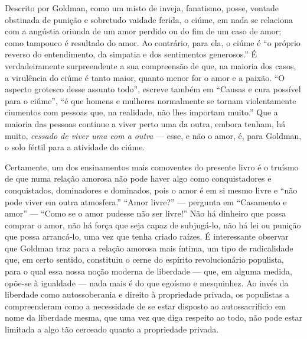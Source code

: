 Descrito por Goldman, como um misto de inveja, fanatismo, posse,
vontade obstinada de punição e sobretudo vaidade ferida, o ciúme, em
nada se relaciona com a angústia oriunda de um amor perdido ou
do fim de um caso de amor; como tampouco é resultado do amor. Ao
contrário, para ela, o ciúme é ``o próprio reverso do entendimento, da
simpatia e dos sentimentos generosos.'' É verdadeiramente surpreendente a
sua compreensão de que, na maioria dos casos, a virulência do ciúme é
tanto maior, quanto menor for o amor e a paixão. ``O aspecto grotesco
desse assunto todo'', escreve também em ``Causas e cura possível para o
ciúme'', ``é que homens e mulheres normalmente se tornam violentamente
ciumentos com pessoas que, na realidade, não lhes importam muito.'' Que
a maioria das pessoas continue a viver perto uma da outra, embora
tenham, há muito, \textit{cessado de viver uma com a outra} --- esse, e não o
amor, é, para Goldman, o solo fértil para a atividade do ciúme.

Certamente, um dos ensinamentos mais comoventes do presente livro é o
truísmo de que numa relação amorosa não pode haver algo como
conquistadores e conquistados, dominadores e dominados, pois o amor é em
si mesmo livre e ``não pode viver em outra atmosfera.'' ``Amor livre?''
--- pergunta em ``Casamento e amor'' --- ``Como se o amor pudesse não ser
livre!'' Não há dinheiro que possa comprar o amor, não há força que seja
capaz de subjugá-lo, não há lei ou punição que possa arrancá-lo, uma vez
que tenha criado raízes. É interessante observar que Goldman traz para a
relação amorosa mais íntima, um tipo de radicalidade que, em certo
sentido, constituiu o cerne do espírito revolucionário populista, para o
qual essa nossa noção moderna de liberdade --- que, em alguma medida,
opõe-se à igualdade --- nada mais é do que egoísmo e mesquinhez. Ao invés
da liberdade como autossoberania e direito à propriedade privada, os
populistas a compreenderam como a necessidade de se estar disposto ao
autossacrifício em nome da liberdade mesma, que uma vez que diga
respeito ao todo, não pode estar limitada a algo tão cerceado quanto a
propriedade privada. 

